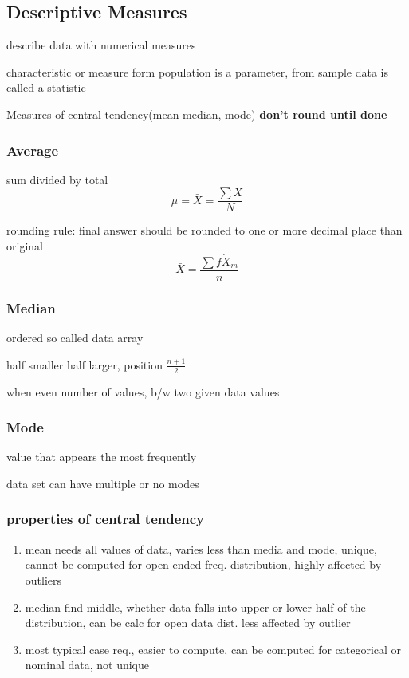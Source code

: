 \documentclass[11pt]{amsart}
\begin{document}
\subsection{Descriptive Measures}
  \par describe data with numerical measures
  \par characteristic or measure form population is a parameter, from sample
  data is called a statistic
  \par Measures of central tendency(mean median, mode)
  \textbf{don't round until done}
  \subsubsection{Average}
  \par sum divided by total
  \begin{equation*}
    \mu = \bar{X} = \frac{\sum{X}}{N}
  \end{equation*}
  \par rounding rule: final answer should be rounded to one or more decimal
  place than original
  \begin{equation}
    \bar{X} = \frac{\sum{f \dot X_m}}{n}
  \end{equation}
  \subsubsection{Median}
  \par ordered so called data array
  \par half smaller half larger, position $\frac{n+1}{2}$
  \par when even number of values, b/w two given data values
  \subsubsection{Mode}
  \par value that appears the most frequently
  \par data set can have multiple or no modes
  \subsubsection{properties of central tendency}
 	\begin{enumerate}
	\item mean needs all values of data, varies less than media and mode, unique, cannot be computed for open-ended freq. distribution, highly affected by outliers
	\item median find middle, whether data falls into upper or lower half of the distribution, can be calc for open data dist. less affected by outlier
	\item most typical case req., easier to compute, can be computed for categorical or nominal data, not unique
	\end{enumerate}
	
\end{document}
